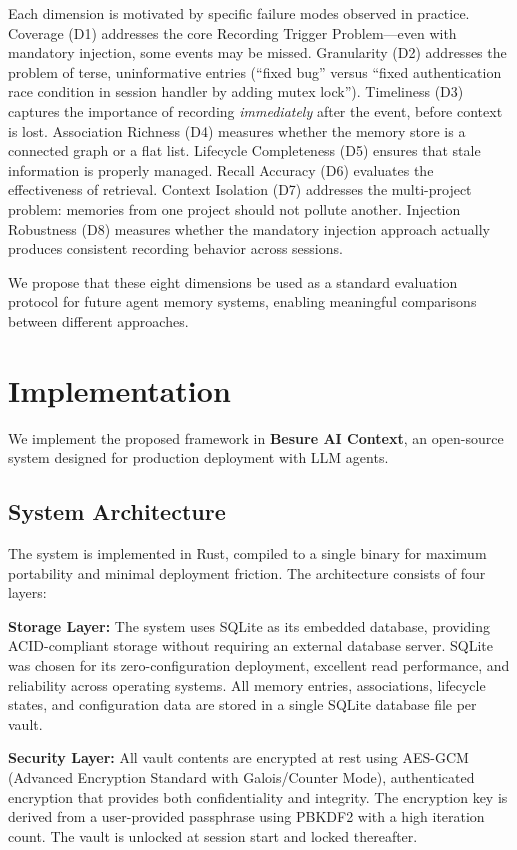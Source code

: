 \documentclass[11pt]{article}
\begin{document}
Each dimension is motivated by specific failure modes observed in practice. Coverage (D1) addresses the core Recording Trigger Problem---even with mandatory injection, some events may be missed. Granularity (D2) addresses the problem of terse, uninformative entries (``fixed bug'' versus ``fixed authentication race condition in session handler by adding mutex lock''). Timeliness (D3) captures the importance of recording \emph{immediately} after the event, before context is lost. Association Richness (D4) measures whether the memory store is a connected graph or a flat list. Lifecycle Completeness (D5) ensures that stale information is properly managed. Recall Accuracy (D6) evaluates the effectiveness of retrieval. Context Isolation (D7) addresses the multi-project problem: memories from one project should not pollute another. Injection Robustness (D8) measures whether the mandatory injection approach actually produces consistent recording behavior across sessions.

We propose that these eight dimensions be used as a standard evaluation protocol for future agent memory systems, enabling meaningful comparisons between different approaches.


\section{Implementation}

We implement the proposed framework in \textbf{Besure AI Context}, an open-source system designed for production deployment with LLM agents.

\subsection{System Architecture}

The system is implemented in Rust, compiled to a single binary for maximum portability and minimal deployment friction. The architecture consists of four layers:

\textbf{Storage Layer:} The system uses SQLite as its embedded database, providing ACID-compliant storage without requiring an external database server. SQLite was chosen for its zero-configuration deployment, excellent read performance, and reliability across operating systems. All memory entries, associations, lifecycle states, and configuration data are stored in a single SQLite database file per vault.

\textbf{Security Layer:} All vault contents are encrypted at rest using AES-GCM (Advanced Encryption Standard with Galois/Counter Mode), authenticated encryption that provides both confidentiality and integrity. The encryption key is derived from a user-provided passphrase using PBKDF2 with a high iteration count. The vault is unlocked at session start and locked thereafter.
\end{document}
